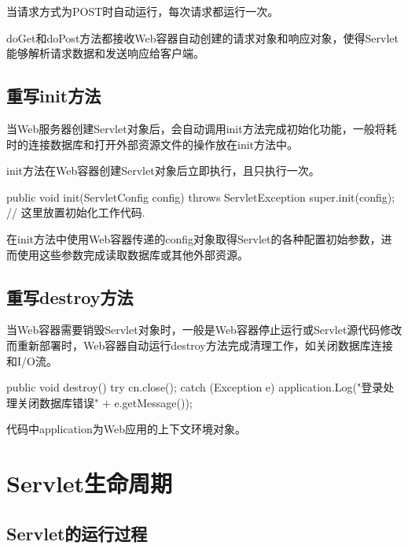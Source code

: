 当请求方式为POST时自动运行，每次请求都运行一次。

{\hei\Red doGet和doPost方法都接收Web容器自动创建的请求对象和响应对象，使得Servlet能够解析请求数据和发送响应给客户端。}

\subsection{重写init方法} 

当Web服务器创建Servlet对象后，会自动调用init方法完成初始化功能，一般将耗时的连接数据库和打开外部资源文件的操作放在init方法中。

init方法在Web容器创建Servlet对象后立即执行，且只执行一次。

\begin{javaCode}
  public void init(ServletConfig config) throws ServletException {
    super.init(config);
    // 这里放置初始化工作代码.
  }
\end{javaCode}

\kai 在init方法中使用Web容器传递的config对象取得Servlet的各种配置初始参数，进而使用这些参数完成读取数据库或其他外部资源。

\subsection{重写destroy方法} 

当Web容器需要销毁Servlet对象时，一般是Web容器停止运行或Servlet源代码修改而重新部署时，Web容器自动运行destroy方法完成清理工作，如关闭数据库连接和I/O流。

\begin{javaCode}
  public  void destroy() {
    try {
      cn.close();
    } catch (Exception e) {
      application.Log("登录处理关闭数据库错误" + e.getMessage());
    }
  }
\end{javaCode}

\kai 代码中application为Web应用的上下文环境对象。

\section{Servlet生命周期}

\subsection{Servlet的运行过程} 

